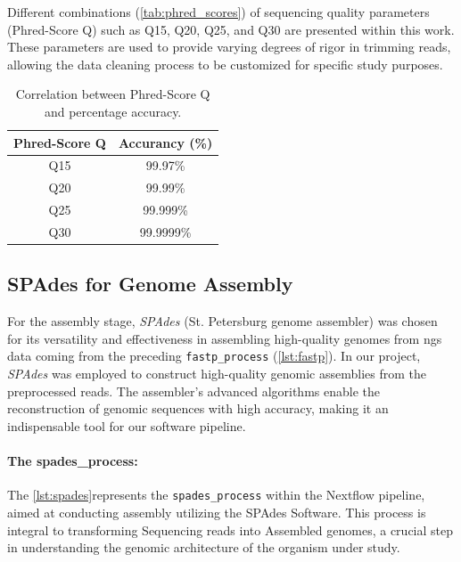 Different combinations (\autoref{tab:phred_scores}) of \gls{sequencing} quality parameters (Phred-Score Q) such as Q15, Q20, Q25, and Q30 are presented within this work. These parameters are used to provide varying degrees of rigor in \gls{trimming} \gls{read}s, allowing the data cleaning process to be customized for specific study purposes.

\begin{table}[ht]
\centering
\begin{tabular}{cc}
\hline
\textbf{Phred-Score Q} & \textbf{Accurancy (\%)} \\
\hline
Q15 & 99.97\% \\
Q20 & 99.99\% \\
Q25 & 99.999\% \\
Q30 & 99.9999\% \\
\end{tabular}
\caption{Correlation between Phred-Score Q and percentage accuracy.}
\label{tab:phred_scores}
\end{table}




\subsection{SPAdes for Genome Assembly}
For the \gls{assembly} stage, \textit{SPAdes} (St. Petersburg genome assembler) was chosen for its versatility and effectiveness in assembling high-quality \gls{genome}s from \gls{ngs} data coming from the preceding \texttt{fastp\_process} (\autoref{lst:fastp}). In our project, \textit{SPAdes} was employed to construct high-quality genomic assemblies from the preprocessed \gls{read}s. The assembler's advanced algorithms enable the reconstruction of genomic sequences with high accuracy, making it an indispensable tool for our software pipeline.

\paragraph{The spades\_process:}

The \autoref{lst:spades}represents the \texttt{spades\_process} within the Nextflow pipeline, aimed at conducting \gls{assembly} utilizing the SPAdes Software. This process is integral to transforming Sequencing \gls{read}s into Assembled \gls{genome}s, a crucial step in understanding the genomic architecture of the organism under study.

